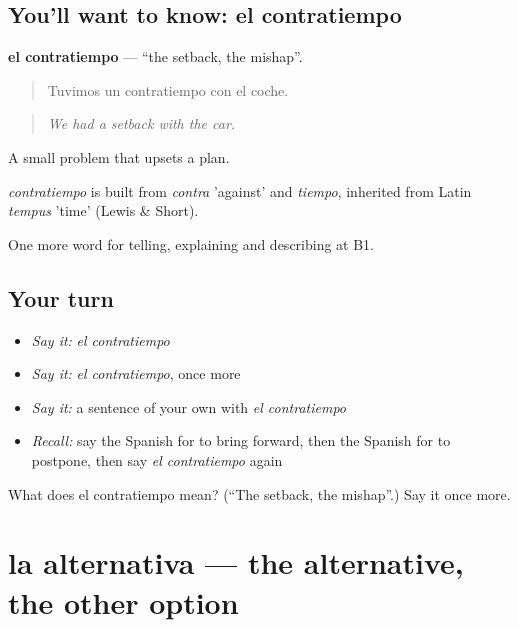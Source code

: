 \subsection*{You'll want to know: el contratiempo}
\textbf{el contratiempo} — \textquotedblleft{}the setback, the mishap\textquotedblright{}.

\begin{quote}
Tuvimos un contratiempo con el coche.
\end{quote}

\begin{quote}
\emph{We had a setback with the car.}
\end{quote}

A small problem that upsets a plan.

\begin{cousinweb}
\emph{contratiempo} is built from \emph{contra} 'against' and \emph{tiempo}, inherited from Latin \emph{tempus} 'time' (Lewis \& Short).
\end{cousinweb}

\begin{grammarlens}[title={What you've built}]
One more word for telling, explaining and describing at B1.
\end{grammarlens}

\subsection*{Your turn}
\begin{itemize}
\raggedright
  \item \emph{Say it:} \emph{el contratiempo}
  \item \emph{Say it:} \emph{el contratiempo}, once more
  \item \emph{Say it:} a sentence of your own with \emph{el contratiempo}
  \item \emph{Recall:} say the Spanish for to bring forward, then the Spanish for to postpone, then say \emph{el contratiempo} again
\end{itemize}

\begin{tcolorbox}[breakable,colback=teal!4,colframe=teal!35!black,title={Before you move on}]
What does el contratiempo mean? (\textquotedblleft{}The setback, the mishap\textquotedblright{}.) Say it once more.
\end{tcolorbox}
\section[la alternativa]{la alternativa — the alternative, the other option}

